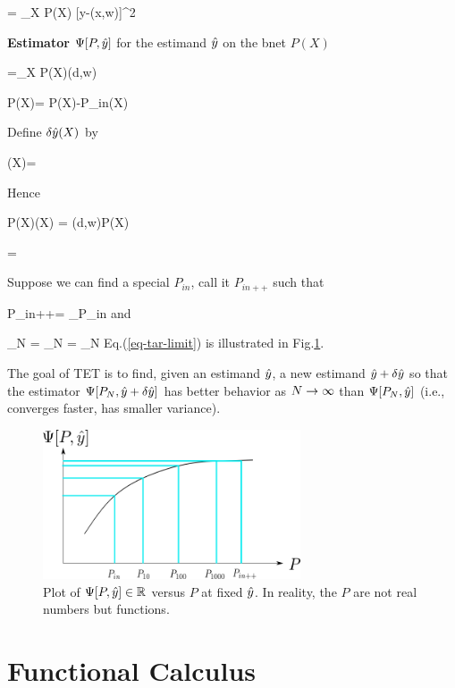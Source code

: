 \beq
\call[P, \haty]= \sum_X P(X) [y-\haty(x,w)]^2
\eeq

{\bf Estimator}
 $\Psi[P, {\hat{y}}]$ for the estimand ${\hat{y}}$
on the bnet $P(X)$

\beq
\Psi[P, \haty] =\sum_X P(X)\haty(d,w)
\eeq

\beq
\delta P(X)=
P(X)-P_{in}(X)
\eeq

Define $\delta{\hat{y}}(X)$ by

\beq
\delta\haty(X)= 
\eeq

Hence

\beq
P(X)\delta\haty(X) = \haty(d,w)\delta P(X)
\eeq

\beq
{}=
\eeq


Suppose we can find a special $P_{in}$,
call it $P_{in++}$ such that


\beq
P_{in++}= \argmin_{P_{in}}\call[P_{in}, \haty]
\eeq
and

\beq
\lim_{N\rarrow \infty}
=
\lim_{N\rarrow \infty}
=
\lim_{N\rarrow \infty}
\Psi[P_N, \haty]
\label{eq-tar-limit}
\eeq
Eq.(\ref{eq-tar-limit}) is illustrated in
Fig.\ref{fig-targeted-p-psi-plot.png}.

The goal of TET
is to find, given an estimand ${\hat{y}}$,
a new estimand ${\hat{y}} +\delta {\hat{y}}$
so that the
estimator $\Psi[P_N, {\hat{y}}+\delta {\hat{y}}]$
has better behavior as $N\rightarrow \infty$ than
$\Psi[P_N, {\hat{y}}]$ (i.e., converges faster,
has smaller variance).


\begin{figure}[h!]
\centering
\includegraphics[width=3in]
{targeted-est/targeted-p-psi-plot.png}
\caption{
Plot of $\Psi[P, {\hat{y}}]\in { \mathbb{R}}$ versus $P$
at fixed ${\hat{y}}$.
In reality, the $P$ are not real numbers but
functions.
}
\label{fig-targeted-p-psi-plot.png}
\end{figure}


\section{Functional Calculus}

